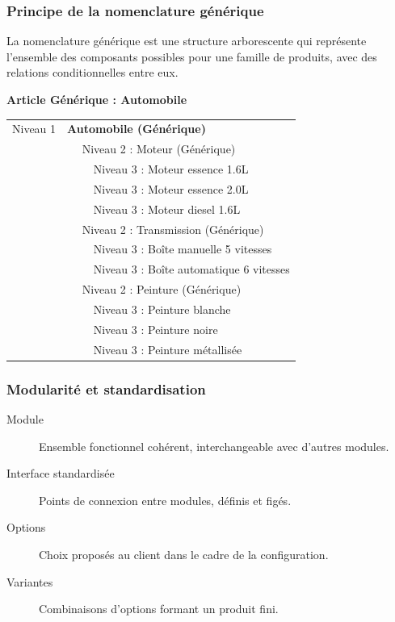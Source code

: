 \documentclass{article}
\begin{document}
\subsubsection{Principe de la nomenclature générique}

La nomenclature générique est une structure arborescente qui représente l'ensemble des composants possibles pour une famille de produits, avec des relations conditionnelles entre eux.

\begin{tcolorbox}[colback=grisclair, colframe=gray!70!black, title=Structure d'une nomenclature générique]
\begin{center}
\textbf{Article Générique : Automobile}
\end{center}
\begin{tabular}{ll}
Niveau 1 & \textbf{Automobile (Générique)} \\
& $\quad$ Niveau 2 : Moteur (Générique) \\
& $\qquad$ Niveau 3 : Moteur essence 1.6L \\
& $\qquad$ Niveau 3 : Moteur essence 2.0L \\
& $\qquad$ Niveau 3 : Moteur diesel 1.6L \\
& $\quad$ Niveau 2 : Transmission (Générique) \\
& $\qquad$ Niveau 3 : Boîte manuelle 5 vitesses \\
& $\qquad$ Niveau 3 : Boîte automatique 6 vitesses \\
& $\quad$ Niveau 2 : Peinture (Générique) \\
& $\qquad$ Niveau 3 : Peinture blanche \\
& $\qquad$ Niveau 3 : Peinture noire \\
& $\qquad$ Niveau 3 : Peinture métallisée \\
\end{tabular}
\end{tcolorbox}

\subsubsection{Modularité et standardisation}

\begin{description}
    \item[Module] Ensemble fonctionnel cohérent, interchangeable avec d'autres modules.
    \item[Interface standardisée] Points de connexion entre modules, définis et figés.
    \item[Options] Choix proposés au client dans le cadre de la configuration.
    \item[Variantes] Combinaisons d'options formant un produit fini.
\end{description}
\end{document}
